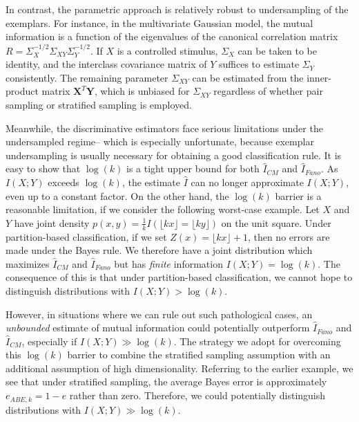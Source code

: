 \documentclass{article}
\begin{document}
In contrast, the parametric approach is relatively robust to undersampling of the exemplars.
For instance, in the multivariate Gaussian model, the mutual information is a function of the eigenvalues of the canonical correlation matrix $R  =\Sigma_X^{-1/2}\Sigma_{XY}\Sigma_Y^{-1/2}$.  If $X$ is a controlled stimulus, $\Sigma_X$ can be taken to be identity, and the interclass covariance matrix of $Y$ suffices to estimate $\Sigma_Y$ consistently.  The remaining parameter $\Sigma_{XY}$ can be estimated from the inner-product matrix $\boldsymbol{X}^T \boldsymbol{Y}$, which is unbiased for $\Sigma_{XY}$ regardless of whether pair sampling or stratified sampling is employed.

Meanwhile, the discriminative estimators face serious limitations under the undersampled regime--
which is especially unfortunate, because exemplar undersampling is usually necessary for obtaining a good
classification rule.  It is easy to show that $\log(k)$ is a tight upper bound for both $\hat{I}_{CM}$ and 
$\hat{I}_{Fano}$.  As $I(X; Y)$ exceeds $\log(k)$, the estimate $\hat{I}$ can no longer approximate $I(X; Y)$, even up to a constant factor.  On the other hand, the $\log(k)$ barrier is a reasonable limitation, if we consider the following worst-case example.  Let $X$ and $Y$ have joint density
$
p(x, y) = \frac{1}{k}I(\lfloor kx \rfloor = \lfloor ky \rfloor)
$ on the unit square.  Under partition-based classification, if we set $Z(x) = \lfloor kx \rfloor + 1$,
then no errors are made under the Bayes rule. We therefore have a joint distribution which maximizes $\hat{I}_{CM}$ and $\hat{I}_{Fano}$ but has \emph{finite} information $I(X; Y) = \log(k)$.
The consequence of this is that under partition-based classification,
we cannot hope to distinguish distributions with $I(X; Y) > \log(k)$.

However, in situations where we can rule out such pathological cases, an \emph{unbounded} estimate of mutual information could potentially outperform $\hat{I}_{Fano}$ and
$\hat{I}_{CM}$, especially if $I(X; Y) \gg \log(k)$.
The strategy we adopt for overcoming this $\log(k)$ barrier to combine the stratified sampling assumption with an additional assumption of high dimensionality.
Referring to the earlier example, we see that under stratified sampling,
the average Bayes error is approximately $e_{ABE, k} = 1- e$ rather than zero.
Therefore, we could potentially distinguish distributions with $I(X; Y) \gg \log(k)$.
\end{document}

